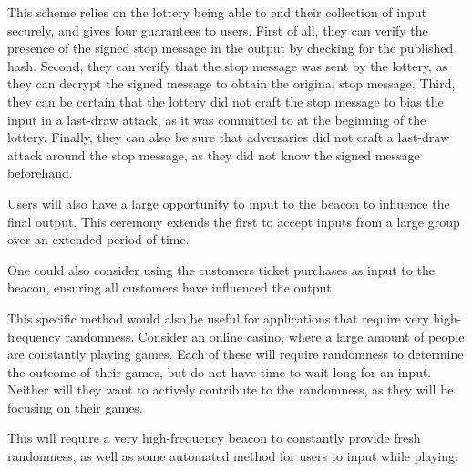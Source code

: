 This scheme relies on the lottery being able to end their collection of input securely, and gives four guarantees to users. First of all, they can verify the presence of the signed stop message in the output by checking for the published hash. Second, they can verify that the stop message was sent by the lottery, as they can decrypt the signed message to obtain the original stop message. Third, they can be certain that the lottery did not craft the stop message to bias the input in a last-draw attack, as it was committed to at the beginning of the lottery. Finally, they can also be sure that adversaries did not craft a last-draw attack around the stop message, as they did not know the signed message beforehand.

Users will also have a large opportunity to input to the beacon to influence the final output. This ceremony extends the first to accept inputs from a large group over an extended period of time.


One could also consider using the customers ticket purchases as input to the beacon, ensuring all customers have influenced the output.

This specific method would also be useful for applications that require very high-frequency randomness. Consider an online casino, where a large amount of people are constantly playing games. Each of these will require randomness to determine the outcome of their games, but do not have time to wait long for an input. Neither will they want to actively contribute to the randomness, as they will be focusing on their games.

This will require a very high-frequency beacon to constantly provide fresh randomness, as well as some automated method for users to input while playing.